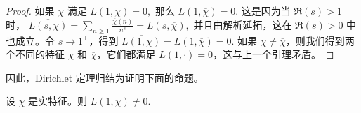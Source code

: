 \begin{proof}
	如果 $\chi$ 满足
	\(\textstyle L(1,\allowbreak{}\chi)=\allowbreak{}0,\allowbreak{}\)
	那么
	\(\textstyle L(1,\allowbreak{}\overline{\chi})=\allowbreak{}0.\)
	这是因为当 $\Re(s)>1$ 时，
	\(\textstyle \overline{L(s,\allowbreak{}\chi)} =\allowbreak{} \sum_{n\geq\allowbreak{} 1}\frac{\overline{\chi}(n)}{n^s} =\allowbreak{} L(s,\allowbreak{}\overline{\chi}),\allowbreak{}\)
	并且由解析延拓，这在 $\Re(s)>0$ 中也成立。令 $s\to1^+$，得到
	\(\textstyle \overline{L(1,\allowbreak{}\chi)}=\allowbreak{}L(1,\allowbreak{}\overline{\chi})=\allowbreak{}0.\)
	如果 $\chi\neq\overline{\chi}$，则我们得到两个不同的特征 $\chi$ 和 $\overline{\chi}$，它们都满足 $L(1,\cdot)=0$，这与上一个引理矛盾。
\end{proof}

因此，Dirichlet 定理归结为证明下面的命题。

\begin{proposition}
	设 $\chi$ 是实特征。则
	\(\textstyle L(1,\allowbreak{}\chi)\neq0.\)
\end{proposition}

